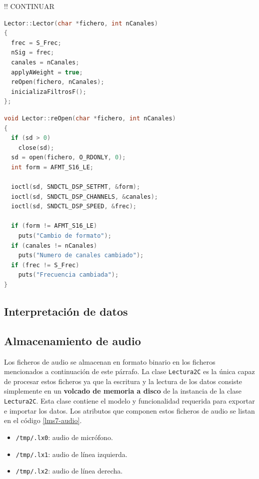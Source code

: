 !! CONTINUAR

\begin{lstlisting}[language=c++, label={lst:lms7-lector-constructor}, caption={Constructor de la clase Lector.}]
Lector::Lector(char *fichero, int nCanales)
{
  frec = S_Frec;
  nSig = frec;
  canales = nCanales;
  applyAWeight = true;
  reOpen(fichero, nCanales);
  inicializaFiltrosF();
};

\end{lstlisting}

\begin{lstlisting}[language=c++, label={lst:lms7-lector-constructor}, caption={Apertura de un dispositivo de audio en el LM7.}]
void Lector::reOpen(char *fichero, int nCanales)
{
  if (sd > 0)
    close(sd);
  sd = open(fichero, O_RDONLY, 0);
  int form = AFMT_S16_LE;

  ioctl(sd, SNDCTL_DSP_SETFMT, &form);
  ioctl(sd, SNDCTL_DSP_CHANNELS, &canales);
  ioctl(sd, SNDCTL_DSP_SPEED, &frec);

  if (form != AFMT_S16_LE)
    puts("Cambio de formato");
  if (canales != nCanales)
    puts("Numero de canales cambiado");
  if (frec != S_Frec)
    puts("Frecuencia cambiada");
}

\end{lstlisting}

\subsection{Interpretación de datos}

\subsection{Almacenamiento de audio}

Los ficheros de audio se almacenan en formato binario en los ficheros mencionados a continuación de este párrafo. La clase \verb|Lectura2C| es la única capaz de procesar estos ficheros ya que la escritura y la lectura de los datos consiste simplemente en un \textbf{volcado de memoria a disco} de la instancia de la clase \verb|Lectura2C|. Esta clase contiene el modelo y funcionalidad requerida para exportar e importar los datos. Los atributos que componen estos ficheros de audio se listan en el código \ref{lms7-audio}.

\begin{itemize}
	 \item \verb|/tmp/.lx0|: audio de micrófono.
	 \item \verb|/tmp/.lx1|: audio de línea izquierda.
	 \item \verb|/tmp/.lx2|: audio de línea derecha.
\end{itemize}

